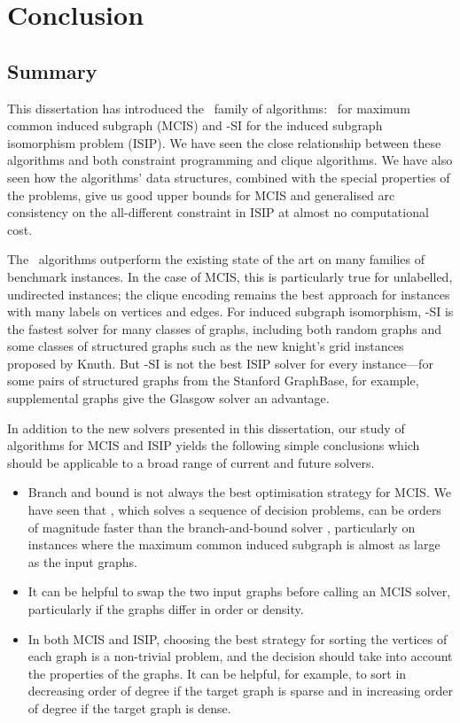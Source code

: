 \chapter{Conclusion}
\label{c:conclusion}

\section{Summary}

This dissertation has introduced the \McSplit\ family of algorithms: \McSplit\
for maximum common induced subgraph (MCIS) and \McSplit-SI for the induced
subgraph isomorphism problem (ISIP).  We have seen the close relationship
between these algorithms and both constraint programming and clique algorithms.
We have also seen how the algorithms' data structures, combined with the
special properties of the problems, give us good upper bounds for MCIS and
generalised arc consistency on the all-different constraint in ISIP at almost
no computational cost.

The \McSplit\ algorithms outperform
the existing state of the art on many families of benchmark instances.  In the
case of MCIS, this is particularly true for unlabelled, undirected instances;
the clique encoding remains the best approach for instances with many labels on
vertices and edges.  For induced subgraph isomorphism, \McSplit-SI is the
fastest solver for many classes of graphs, including both random graphs and
some classes of structured graphs such as the new knight's grid instances
proposed by Knuth.  But
\McSplit-SI is not the best ISIP solver for every instance---for some pairs of
structured graphs from the Stanford GraphBase, for example,
supplemental graphs give the Glasgow solver an advantage.

In addition to the new solvers presented in this dissertation,
our study of algorithms for MCIS and ISIP yields the following
simple conclusions which should be applicable to a broad
range of current and future solvers.

\begin{itemize}
    \item Branch and bound is not always the best optimisation strategy
        for MCIS. We have seen that \McSplitDown, which solves a sequence
        of decision problems, can be orders of magnitude faster than
        the branch-and-bound solver \McSplit, particularly on instances
        where the maximum common induced subgraph is almost as large as
        the input graphs.
    \item It can be helpful to swap the two input graphs before calling
        an MCIS solver, particularly if the graphs differ
        in order or density.
    \item In both MCIS and ISIP, choosing the best strategy for sorting the vertices
        of each graph is a non-trivial problem, and the decision
        should take into account the properties
        of the graphs.  It can be helpful, for example, to sort in decreasing
        order of degree if the target graph is sparse and in increasing order of
        degree if the target graph is dense.
\end{itemize}

